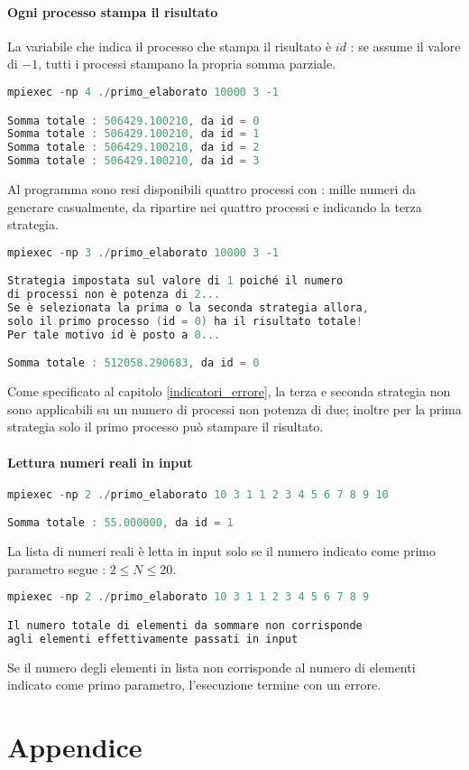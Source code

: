 \documentclass[a4paper,11pt]{book}
\begin{document}
\subsubsection{Ogni processo stampa il risultato}
La variabile che indica il processo che stampa il risultato è $id$ : se assume il valore di $-1$, tutti i processi stampano la propria somma parziale.
\begin{lstlisting}[language=C]
mpiexec -np 4 ./primo_elaborato 10000 3 -1

Somma totale : 506429.100210, da id = 0
Somma totale : 506429.100210, da id = 1
Somma totale : 506429.100210, da id = 2
Somma totale : 506429.100210, da id = 3
\end{lstlisting}
Al programma sono resi disponibili quattro processi con : mille numeri da generare casualmente, da ripartire nei quattro processi e indicando la terza strategia.
\begin{lstlisting}[language=C]
mpiexec -np 3 ./primo_elaborato 10000 3 -1

Strategia impostata sul valore di 1 poiché il numero 
di processi non è potenza di 2...
Se è selezionata la prima o la seconda strategia allora,
solo il primo processo (id = 0) ha il risultato totale!
Per tale motivo id è posto a 0...

Somma totale : 512058.290683, da id = 0
\end{lstlisting}
Come specificato al capitolo \ref{indicatori_errore}, la terza e seconda strategia non sono applicabili su un numero di processi non potenza di due; inoltre per la prima strategia solo il primo processo può stampare il risultato.

\subsubsection{Lettura numeri reali in input}
\begin{lstlisting}[language=C]
mpiexec -np 2 ./primo_elaborato 10 3 1 1 2 3 4 5 6 7 8 9 10

Somma totale : 55.000000, da id = 1
\end{lstlisting}
La lista di numeri reali è letta in input solo se il numero indicato come primo parametro segue : $2 \leq N \leq 20$. 
\begin{lstlisting}[language=C]
mpiexec -np 2 ./primo_elaborato 10 3 1 1 2 3 4 5 6 7 8 9 

Il numero totale di elementi da sommare non corrisponde 
agli elementi effettivamente passati in input 
\end{lstlisting}
Se il numero degli elementi in lista non corrisponde al numero di elementi indicato come primo parametro, l'esecuzione termine con un errore.
\chapter{Appendice}
\end{document}
